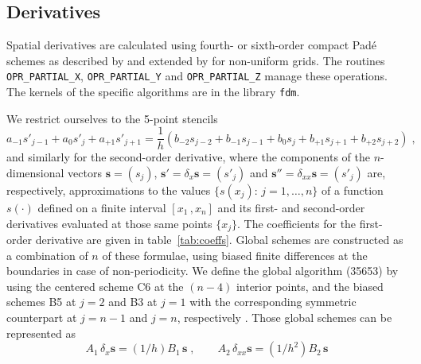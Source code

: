 \subsection{Derivatives}\label{sec:fdm}

Spatial derivatives are calculated using fourth- or sixth-order compact Pad\'{e} schemes as described by \cite{Lele:1992} and extended by \cite{Shukla:2005} for non-uniform grids. The routines {\tt OPR\_PARTIAL\_X}, {\tt OPR\_PARTIAL\_Y} and {\tt OPR\_PARTIAL\_Z} manage these operations. The kernels of the specific algorithms are in the library {\tt fdm}.

We restrict ourselves to the 5-point stencils
\begin{equation}
a_{-1}s'_{j-1}+a_{0}s'_{j}+a_{+1}s'_{j+1}=
\frac{1}{h}(b_{-2}s_{j-2}+b_{-1}s_{j-1}+b_{0}s_{j}+b_{+1}s_{j+1}+b_{+2}s_{j+2}) \;,
\label{equ:coefs}
\end{equation}
and similarly for the second-order derivative, where the components of the $n$-dimensional vectors $\mathbf{s}=(s_j)$, $\mathbf{s'}=\delta_x \mathbf{s}=(s'_j)$ and $\mathbf{s''}=\delta_{xx} \mathbf{s}=(s'_j)$ are, respectively, approximations to the values $\{s(x_j):\, j=1,\ldots,n\}$ of a function $s(\cdot)$ defined on a finite interval $[x_1\,,x_n]$ and its first- and second-order derivatives evaluated at those same points $\{x_j\}$. The coefficients for the first-order derivative are given in table~\ref{tab:coeffs}. Global schemes are constructed as a combination of $n$ of these formulae, using biased finite differences at the boundaries in case of non-periodicity.  We define the global algorithm (35653) by using the centered scheme C6 at the $(n-4)$ interior points, and the biased schemes B5 at $j=2$ and B3 at $j=1$ with the corresponding symmetric counterpart at $j=n-1$ and $j=n$, respectively \cite{Carpenter:1993}. Those global schemes can be represented as
\begin{equation}
  A_1\, \delta_x \mathbf{s}=(1/h)B_1\, \mathbf{s} \;, \qquad
  A_2\, \delta_{xx} \mathbf{s}=(1/h^2)B_2\, \mathbf{s}
\label{equ:fdm}
\end{equation}
